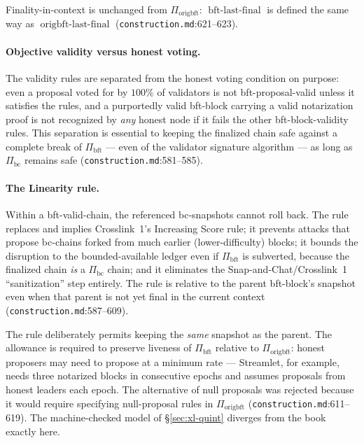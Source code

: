 \documentclass[11pt,a4paper]{article}
\theoremstyle{definition}
\begin{document}
Finality-in-context is unchanged from $\Pi_{\mathrm{origbft}}$:
$\operatorname{bft\text{-}last\text{-}final}$ is defined the same way as
$\operatorname{origbft\text{-}last\text{-}final}$
(\texttt{construction.md}:621--623).

\paragraph{Objective validity versus honest voting.} The validity rules
are separated from the honest voting condition on purpose: even a
proposal voted for by $100\%$ of validators is not bft-proposal-valid
unless it satisfies the rules, and a purportedly valid bft-block carrying
a valid notarization proof is not recognized by \emph{any} honest node if
it fails the other bft-block-validity rules. This separation is essential
to keeping the finalized chain safe against a complete break of
$\Pi_{\mathrm{bft}}$ --- even of the validator signature algorithm --- as
long as $\Pi_{\mathrm{bc}}$ remains safe
(\texttt{construction.md}:581--585).

\paragraph{The Linearity rule.} Within a bft-valid-chain, the referenced
bc-snapshots cannot roll back. The rule replaces and implies Crosslink~1's
Increasing Score rule; it prevents attacks that propose bc-chains forked
from much earlier (lower-difficulty) blocks; it bounds the disruption to
the bounded-available ledger even if $\Pi_{\mathrm{bft}}$ is subverted,
because the finalized chain \emph{is} a $\Pi_{\mathrm{bc}}$ chain; and it
eliminates the Snap-and-Chat/Crosslink~1 ``sanitization'' step entirely.
The rule is relative to the parent bft-block's snapshot even when that
parent is not yet final in the current context
(\texttt{construction.md}:587--609).

The rule deliberately permits keeping the \emph{same} snapshot as the
parent. The allowance is required to preserve liveness of
$\Pi_{\mathrm{bft}}$ relative to $\Pi_{\mathrm{origbft}}$: honest
proposers may need to propose at a minimum rate --- Streamlet, for
example, needs three notarized blocks in consecutive epochs and assumes
proposals from honest leaders each epoch. The alternative of null
proposals was rejected because it would require specifying null-proposal
rules in $\Pi_{\mathrm{origbft}}$ (\texttt{construction.md}:611--619).
The machine-checked model of \S\ref{sec:xl-quint} diverges from the book
exactly here.
\end{document}

